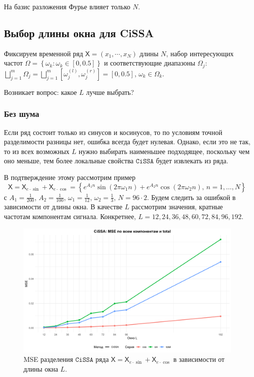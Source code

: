 \documentclass[12pt, specialist, subf
]{disser}
\theoremstyle{definition}
\newcommand{\CISSA}{\texttt{CiSSA}}
\newcommand{\TS}{\mathsf{X}}
\begin{document}
На базис разложения Фурье влияет только $N$.


\subsection{Выбор длины окна для CiSSA}
\label{subsec:cissa_L_choice}

Фиксируем временной ряд $\TS = \left(x_1, \cdots, x_N\right)$ длины $N$, набор интересующих частот $\Omega = \left\{\omega_k: \omega_k \in [0, 0.5] \right\}$ и соответствующие диапазоны $\Omega_j$:
		      $\bigsqcup \limits_{j=1}^m \Omega_j =
			      \bigsqcup \limits_{j=1}^m
			      \left[ \omega_j^{(l)}, \omega_j^{(r)} \right] =
			      [0, 0.5]$, $\omega_k \in \Omega_k$.

Возникает вопрос: какое $L$ лучше выбрать?

\subsubsection*{Без шума}

Если ряд состоит только из синусов и косинусов, то по условиям точной разделимости разницы нет, ошибка всегда будет нулевая. Однако, если это не так, то из всех возможных $L$ нужно выбирать наименьшее подходящее, поскольку чем оно меньше, тем более локальные свойства $\CISSA$ будет извлекать из ряда.

В подтверждение этому рассмотрим пример 
\[\TS = \TS_{e\cdot\sin} + \TS_{e\cdot\cos} =  \left\{ e^{A_1 n } \sin(2\pi \omega_1 n ) + e^{A_2 n} \cos(2\pi \omega_2 n ), \, n = 1, \dots, N \right\} \]
 с $A_1 = \frac{1}{200}$, $A_2 = \frac{1}{100}$, $\omega_1 = \frac{1}{12}$, $\omega_2 = \frac{1}{3}$, $N = 96 \cdot 2$. Будем следить за ошибкой в зависимости от длины окна. В качестве $L$ рассмотрим значения, кратные частотам компонентам сигнала. Конкретнее,  $L = 12, 24, 36, 48, 60, 72, 84, 96, 192$.

\begin{figure}[H]
	\centering
	\includegraphics[width=1\textwidth]{img/cissa_errors_plot.png}
	\caption{MSE разделения $\CISSA$ ряда $\TS = \TS_{e\cdot\sin} + \TS_{e\cdot\cos}$ в зависимости от длины окна $L$.}
	\label{fig:cissa_error_depends_on_L}
\end{figure}
\end{document}
